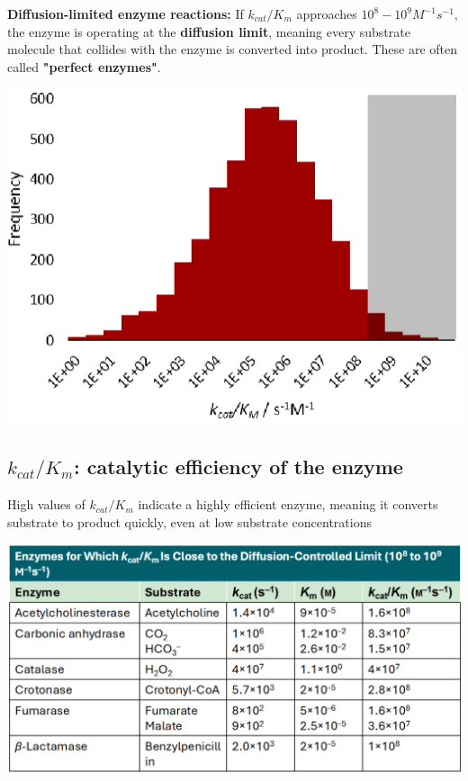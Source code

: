 \documentclass[10pt]{article}
\begin{document}
\textbf{Diffusion-limited enzyme reactions:}  If $k_{cat} / K_m$ approaches $10^8 - 10^9 M^{-1} s^{-1}$, the enzyme is operating at the \textbf{diffusion limit}, meaning every substrate molecule that collides with the enzyme is converted into product.  These are often called \textbf{"perfect enzymes"}.
\begin{center}
    \includegraphics*[scale=0.6]{L1_10.png}
\end{center}

\subsection*{$k_{cat} / K_m$: catalytic efficiency of the enzyme}
High values of $k_{cat} / K_m$ indicate a highly efficient enzyme, meaning it converts substrate to product quickly, even at low substrate concentrations
\begin{center}
    \includegraphics*[scale=0.6]{L1_11.png}
\end{center}
\end{document}
